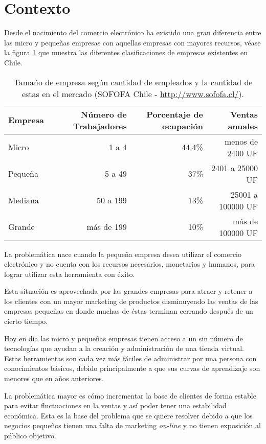\section{Contexto}

Desde el nacimiento del comercio electrónico ha existido una gran diferencia
entre las micro y pequeñas empresas con aquellas empresas con mayores recursos,
véase la figura \ref{tab:tam_empresa} que muestra las diferentes clasificaciones
de empresas existentes en Chile.

\begin{table}[h]
\footnotesize
\centering
\begin{tabular}{|l|r|r|r|}
\hline
{\bf Empresa}  & {\bf Número de Trabajadores} & {\bf Porcentaje de ocupación} & {\bf Ventas anuales}\\
\hline
Micro    & 1 a 4                & 44.4\%  & menos de 2400 UF\\
\hline
Pequeña  & 5 a 49               & 37\%  & 2401 a 25000 UF\\
\hline
Mediana  & 50 a 199             & 13\%  & 25001 a 100000 UF\\
\hline
Grande   & más de 199           & 10\%  & más de 100000 UF\\
\hline
\end{tabular}
\caption[TamañoEmpresa]{Tamaño de empresa según cantidad de empleados y
la cantidad de estas en el mercado (SOFOFA Chile - \url{http://www.sofofa.cl/}).}
\label{tab:tam_empresa}
\end{table}


La problemática nace cuando la pequeña empresa desea utilizar el comercio
electrónico y no cuenta con los recursos necesarios, monetarios y humanos,
para lograr utilizar esta herramienta con éxito.

Esta situación es aprovechada por las grandes empresas para atraer y retener a los
clientes con un mayor marketing de productos disminuyendo las ventas de las
empresas pequeñas en donde muchas de éstas terminan cerrando después de un cierto
tiempo.

Hoy en día las micro y pequeñas empresas tienen acceso a un sin número de
tecnologías que ayudan a la creación y administración de una tienda virtual.
Estas herramientas son cada vez más fáciles de administrar por una persona
con conocimientos básicos, debido principalmente a que sus curvas de aprendizaje
son menores que en años anteriores.

La problemática mayor es cómo incrementar la base de clientes de forma estable
para evitar fluctuaciones en la ventas y así poder tener una estabilidad económica.
Esta es la base del problema que se quiere resolver debido a que los negocios
pequeños tienen una falta de marketing \emph{on-line} y no tienen exposición al público
objetivo.

